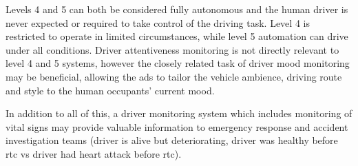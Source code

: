 \documentclass[11pt, parskip=half*,twoside=false]{scrbook}
\begin{document}
Levels 4 and 5 can both be considered fully autonomous and the human driver is never expected or required to take control of the driving task. Level 4 is restricted to operate in limited circumstances, while level 5 automation can drive under all conditions. Driver attentiveness monitoring is not directly relevant to level 4 and 5 systems, however the closely related task of driver mood monitoring may be beneficial, allowing the \gls{ads} to tailor the vehicle ambience, driving route and style to the human occupants' current mood.

In addition to all of this, a driver monitoring system which includes monitoring of vital signs may provide valuable information to emergency response and accident investigation teams (driver is alive but deteriorating, driver was healthy before \gls{rtc} vs driver had heart attack before \gls{rtc}). 
\end{document}
